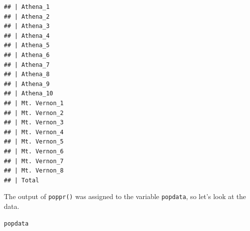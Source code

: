 \documentclass[letterpaper]{article}\usepackage[]{graphicx}\usepackage[]{color}
\makeatletter
\newcommand{\hlstd}[1]{\textcolor[rgb]{0,0,0}{#1}}%
\newenvironment{kframe}{%
 \def\at@end@of@kframe{}%
 \ifinner\ifhmode%
  \def\at@end@of@kframe{\end{minipage}}%
  \begin{minipage}{\columnwidth}%
 \fi\fi%
 \def\FrameCommand##1{\hskip\@totalleftmargin \hskip-\fboxsep
 \colorbox{shadecolor}{##1}\hskip-\fboxsep
     \hskip-\linewidth \hskip-\@totalleftmargin \hskip\columnwidth}%
 \MakeFramed {\advance\hsize-\width
   \@totalleftmargin\z@ \linewidth\hsize
   \@setminipage}}%
 {\par\unskip\endMakeFramed%
 \at@end@of@kframe}
\newenvironment{knitrout}{}{} %
\makeatother
\begin{document}
\begin{knitrout}\footnotesize
{}\color{fgcolor}\begin{kframe}
\begin{verbatim}
## | Athena_1 
## | Athena_2 
## | Athena_3 
## | Athena_4 
## | Athena_5 
## | Athena_6 
## | Athena_7 
## | Athena_8 
## | Athena_9 
## | Athena_10 
## | Mt. Vernon_1 
## | Mt. Vernon_2 
## | Mt. Vernon_3 
## | Mt. Vernon_4 
## | Mt. Vernon_5 
## | Mt. Vernon_6 
## | Mt. Vernon_7 
## | Mt. Vernon_8 
## | Total
\end{verbatim}
\end{kframe}
\end{knitrout}

The output of \texttt{poppr()} was assigned to the variable \texttt{popdata}, so let's look at the data.
\begin{knitrout}\footnotesize
{}\color{fgcolor}\begin{kframe}
\begin{alltt}
\hlstd{popdata}
\end{alltt}
\end{kframe}
\end{knitrout}
\end{document}
